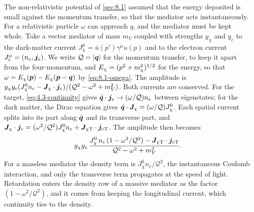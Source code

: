 The non-relativistic potential of \cref{sec:8.1} assumed that the energy deposited is small against the momentum transfer, so that the mediator acts instantaneously. For a relativistic particle $\omega$ can approach $q$, and the mediator must be kept whole. Take a vector mediator of mass $m_V$ coupled with strengths $y_\chi$ and $y_e$ to the dark-matter current $J^\mu_\chi = \bar u(p')\gamma^\mu u(p)$ and to the electron current $J^\mu_e = (n_e, \bm{j}_e)$. We write $\mathcal{Q} = |\bm{q}|$ for the momentum transfer, to keep it apart from the four-momentum, and $E_\chi = (p^2 + m_{\chi}^2)^{1/2}$ for the energy, so that $\omega = E_\chi(\bm{p}) - E_\chi(\bm{p} - \bm{q})$ by \cref{eq:8.1-omega}. The amplitude is $y_\chi y_e(J^0_\chi n_e - \bm{J}_\chi\cdot\bm{j}_e)/(\mathcal{Q}^2 - \omega^2 + m_V^2)$. Both currents are conserved. For the target, \cref{eq:4.3-continuity} gives $\hat{\bm{q}}\cdot\bm{j}_e \to (\omega/\mathcal{Q})n_e$ between eigenstates; for the dark matter, the Dirac equation gives $\hat{\bm{q}}\cdot\bm{J}_\chi = (\omega/\mathcal{Q})J^0_\chi$. Each spatial current splits into its part along $\hat{\bm{q}}$ and its transverse part, and $\bm{J}_\chi\cdot\bm{j}_e = (\omega^2/\mathcal{Q}^2)J^0_\chi n_e + \bm{J}_{\chi\mathrm{T}}\cdot\bm{j}_{e\mathrm{T}}$. The amplitude then becomes
\begin{equation}
  y_\chi y_e\,\frac{J^0_\chi\,n_e\,(1 - \omega^2/\mathcal{Q}^2) - \bm{J}_{\chi\mathrm{T}}\cdot\bm{j}_{e\mathrm{T}}}{\mathcal{Q}^2 - \omega^2 + m_V^2} .
  \label{eq:10.9-amp}
\end{equation}
For a massless mediator the density term is $J^0_\chi n_e/\mathcal{Q}^2$, the instantaneous Coulomb interaction, and only the transverse term propagates at the speed of light. Retardation enters the density row of a massive mediator as the factor $(1 - \omega^2/\mathcal{Q}^2)$, and it comes from keeping the longitudinal current, which continuity ties to the density.

